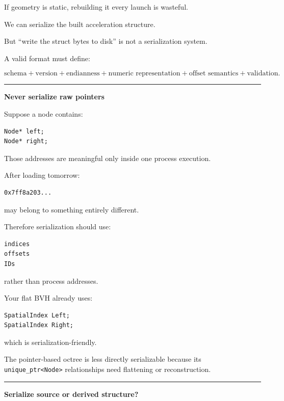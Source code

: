 If geometry is static, rebuilding it every launch is wasteful.

We can serialize the built acceleration structure.

But ``write the struct bytes to disk'' is not a serialization system.

A valid format must define:

\[
\boxed{
\text{schema}
+
\text{version}
+
\text{endianness}
+
\text{numeric representation}
+
\text{offset semantics}
+
\text{validation}.
}
\]

\begin{center}\rule{0.5\linewidth}{0.5pt}\end{center}

\textbf{Never serialize raw pointers}

Suppose a node contains:

\begin{verbatim}
Node* left;
Node* right;
\end{verbatim}

Those addresses are meaningful only inside one process execution.

After loading tomorrow:

\begin{verbatim}
0x7ff8a203...
\end{verbatim}

may belong to something entirely different.

Therefore serialization should use:

\begin{verbatim}
indices
offsets
IDs
\end{verbatim}

rather than process addresses.

Your flat BVH already uses:

\begin{verbatim}
SpatialIndex Left;
SpatialIndex Right;
\end{verbatim}

which is serialization-friendly.

The pointer-based octree is less directly serializable because its \texttt{unique\_ptr\textless{}Node\textgreater{}} relationships need flattening or reconstruction.

\begin{center}\rule{0.5\linewidth}{0.5pt}\end{center}

\textbf{Serialize source or derived structure?}

